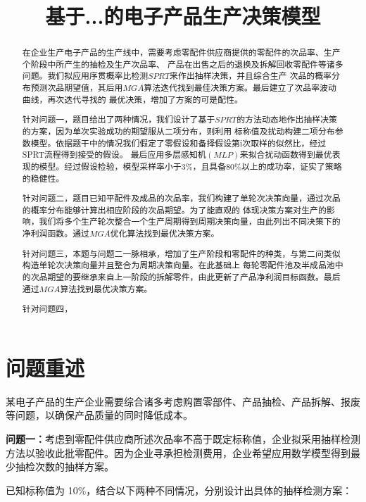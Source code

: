 \documentclass[withoutpreface,bwprint]{cumcmthesis} %
\title{基于...的电子产品生产决策模型}
\begin{document}
\maketitle
\begin{abstract}
	在企业生产电子产品的生产线中，需要考虑零配件供应商提供的零配件的次品率、生产个阶段中所产生的抽检及生产次品率、
	产品在出售之后的退换及拆解回收零配件等诸多问题。我们拟应用序贯概率比检测$SPRT$来作出抽样决策，并且综合生产
	次品的概率分布预测次品期望值，其后用$MGA$算法迭代找到最佳决策方案。最后建立了次品率波动曲线，再次迭代寻找的
	最优决策，增加了方案的可是配性。

	针对问题一，题目给出了两种情况，我们设计了基于$SPRT$的方法动态地作出抽样决策的方案，因为单次实验成功的期望服从二项分布，则利用
	标称值及扰动构建二项分布参数模型。依据题干中的情况我们假定了零假设和备择假设第i次取样的似然比，经过SPRT流程得到接受的假设。
	最后应用多层感知机$(MLP)$来拟合扰动函数得到最优表现的模型。经过假设检验，模型采样率小于3\%，且具备80\%以上的成功率，证实了策略的稳健性。

	针对问题二，题目已知平配件及成品的次品率，我们构建了单轮次决策向量，通过次品的概率分布能够计算出相应阶段的次品期望。为了能直观的
	体现决策方案对生产的影响，我们将多个生产轮次整合一个生产周期得到周期决策向量，由此列出不同决策下的净利润函数。通过$MGA$优化算法找到最优决策方案。

	针对问题三，本题与问题二一脉相承，增加了生产阶段和零配件的种类，与第二问类似构造单轮次决策向量并且整合为周期决策向量。在此基础上
	每轮零配件池及半成品池中的次品期望的要继承来自上一阶段的拆解零件，由此更新了产品净利润目标函数。最后通过$MGA$算法找到最优决策方案。

	针对问题四，

\end{abstract}


\section{问题重述}
某电子产品的生产企业需要综合诸多考虑购置零部件、产品抽检、产品拆解、报废等问题，以确保产品质量的同时降低成本。

\textbf{问题一：}考虑到零配件供应商所述次品率不高于既定标称值，企业拟采用抽样检测方法以验收此批零配件。因为企业寻承担检测费用，企业希望应用数学模型得到最少抽检次数的抽样方案。

已知标称值为 10\%，结合以下两种不同情况，分别设计出具体的抽样检测方案：
\end{document}

